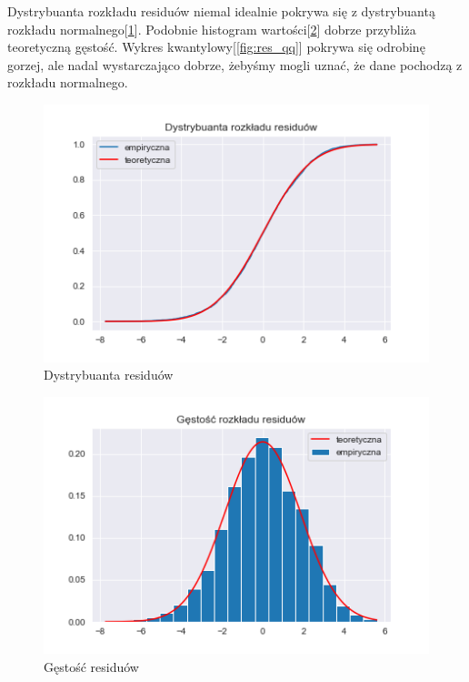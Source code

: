 \documentclass{article}
\theoremstyle{break}
\begin{document}
	Dystrybuanta rozkładu residuów niemal idealnie pokrywa się z dystrybuantą rozkładu normalnego[\ref{fig:res_dist}]. Podobnie histogram wartości[\ref{fig:res_pdf}] dobrze przybliża teoretyczną gęstość. Wykres kwantylowy[\ref{fig:res_qq}] pokrywa się odrobinę gorzej, ale nadal wystarczająco dobrze, żebyśmy mogli uznać, że dane pochodzą z rozkładu normalnego.
	\begin{figure}[H]
		\begin{center}
			\includegraphics[scale=0.63]{res_dist.png}
			\caption{Dystrybuanta residuów}
			\label{fig:res_dist}
		\end{center}
	\end{figure} 
	\begin{figure}[H]
		\begin{center}
			\includegraphics[scale=0.63]{res_pdf.png}
			\caption{Gęstość residuów}
			\label{fig:res_pdf}
		\end{center}
	\end{figure}
\end{document}
